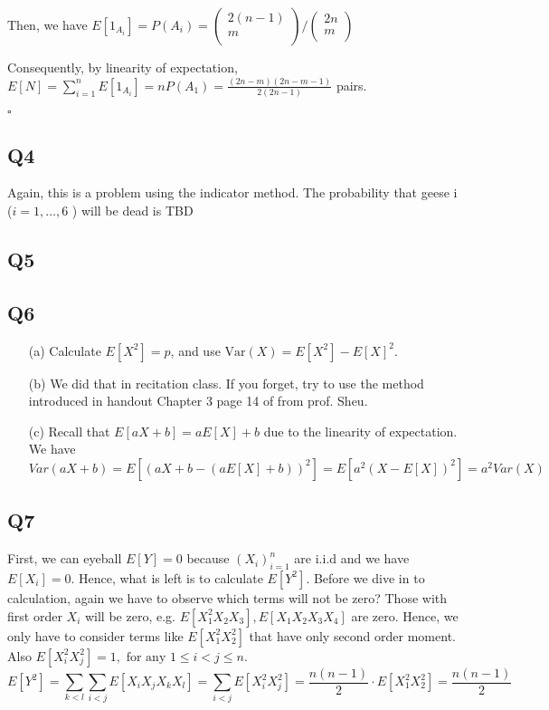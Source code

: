 \documentclass[12pt]{article}
\begin{document}
Then, we have  \(E[1_{A_i}] = P(A_i) = \begin{pmatrix}
     2(n-1) \\
     m \\
\end{pmatrix} / \begin{pmatrix}
     2n \\
     m \\
\end{pmatrix}\)

Consequently, by linearity of expectation,\\
\(E[N] = \sum_{i=1}^{n}E[1_{A_i}] = nP(A_1) = \frac{(2n-m)(2n-m-1)}{2(2n-1)}\) pairs.    

\hspace{\textwidth}\(\square\) 
\subsection*{Q4}
Again, this is a problem using the indicator method. 
The probability that geese i (\(i =1, \dots,6\) ) will be dead is 
TBD
\subsection*{Q5}
\subsection*{Q6}
\begin{itemize}
    \item[(a)] Calculate \(E[X^2] = p\), and use \(\text{Var}(X) = E[X^2] - E[X]^2\).   
    \item[(b)] We did that in recitation class. If you forget, try to use the method introduced in handout Chapter 3 page 14 of from prof. Sheu.  
    \item[(c)] Recall that \(E[aX +b] = aE[X] + b\) due to the linearity of expectation. We have \(Var(aX+b) = E[(aX+b - (aE[X]+b))^2] = E[a^2(X-E[X])^2] = a^2 Var(X) \) 
\end{itemize}
\subsection*{Q7}
First, we can eyeball \(E[Y] = 0\) because \((X_i)_{i=1}^n\) are i.i.d and we have \(E[X_i] = 0\).  
Hence, what is left is to calculate \(E[Y^2]\). Before we dive in to calculation, again we have to observe which terms will not be zero? 
Those with first order \(X_i\) will be zero, e.g. \(E[X_{1}^2 X_2 X_3 ], E[X_1 X_2 X_3 X_4 ]\) are zero. 
Hence, we only have to consider terms like \(E[X_1^2 X_2^2]\) that have only second order moment. Also \(E[X_i^2 X_j^2] = 1, \text{ for any } 1 \leq i < j \leq n\).   
\[
    E[Y^2] = \sum_{k < l}\sum_{i < j} E[X_i X_j X_k X_l ] =  \sum_{i<j} E[X_i^2 X_j^2] = \frac{n(n-1)}{2} \cdot  E[X_1^2 X_2^2] = \frac{n(n-1)}{2}
\]
\end{document}

